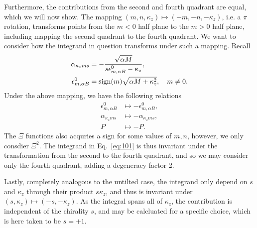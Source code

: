 Furthermore, the contributions from the second and fourth quadrant are equal, which we will now show.
The mapping \( (m,n, \kappa_z) \mapsto (-m, -n, -\kappa_z) \), i.e. a \( \pi \) rotation, transforms points from the \( m < 0 \) half plane to the \( m > 0 \) half plane, including mapping the second quadrant to the fourth quadrant.
We want to consider how the integrand in question transforms under such a mapping.
Recall
\begin{align*}
  \alpha_{\kappa_z m s} &= - \frac{\sqrt{\alpha M} }{s \epsilon_{m, \alpha B}^0 - \kappa_z},\\
  \epsilon_{m, \alpha B}^0 &= \operatorname{sign}(m) \sqrt{\alpha M + \kappa_z^2}, \quad m \neq 0.
\end{align*}
Under the above mapping, we have the following relations
\begin{align}
  \label{eq:92}
  \epsilon_{m, \alpha B}^0 &\mapsto -\epsilon_{m, \alpha B}^0,\\
  \alpha_{\kappa_z m s} &\mapsto -\alpha_{\kappa_z m s},\\
  P &\mapsto -P.
\end{align}
The \( \Xi \) functions also acquries a sign for some values of \( m,n \), however, we only consdier \( \Xi^2 \).
The integrand in Eq.~\eqref{eq:101} is thus invariant under the transformation from the second to the fourth quadrant, and so we may consider only the fourth quadrant, adding a degeneracy factor 2.

Lastly, completely analogous to the untilted case, the integrand only depend on \( s \) and \( \kappa_z \) through their product \( s \kappa_z \), and thus is invariant under \( (s, \kappa_z) \mapsto (-s, -\kappa_z) \).
As the integral spans all of \( \kappa_z \), the contribution is independent of the chirality \( s \), and may be calcluated for a specific choice, which is here taken to be \( s=+1 \).


